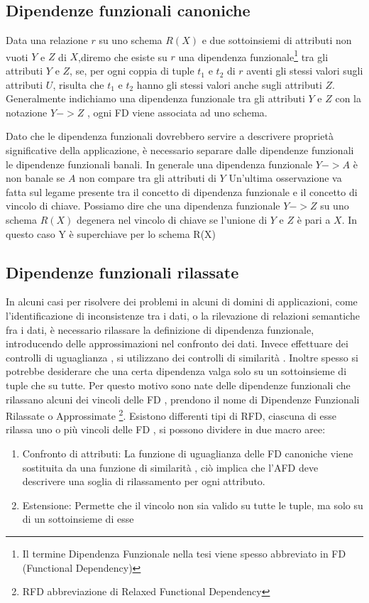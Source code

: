 \subsection{Dipendenze funzionali canoniche}
Data una relazione $r$ su uno schema $R(X)$ e due sottoinsiemi di attributi non vuoti $Y$ e $Z$ di $X$,diremo che esiste su $r$ una dipendenza funzionale\footnote{Il termine Dipendenza Funzionale nella tesi viene spesso abbreviato in FD (Functional Dependency)} tra gli attributi $Y$ e $Z$, se, per ogni coppia di tuple $t_1$ e $t_2$ di $r$ aventi gli stessi valori sugli attributi $U$, risulta che $t_1$ e $t_2$ hanno gli stessi valori anche sugli attributi $Z$.
Generalmente indichiamo una dipendenza funzionale tra gli attributi $Y$ e $Z$ con la notazione $Y->Z$ , ogni FD  viene associata ad uno schema.

Dato che le dipendenza funzionali dovrebbero servire a descrivere proprietà significative della applicazione, è necessario separare dalle dipendenze funzionali le dipendenze funzionali banali.
In generale una dipendenza funzionale $Y->A$ è non banale se $A$ non compare tra gli attributi di $Y$
Un'ultima osservazione va fatta sul legame presente tra il concetto di dipendenza funzionale e il concetto di vincolo di chiave. Possiamo dire che una dipendenza funzionale $Y->Z$ su uno schema $R(X)$ degenera nel vincolo di chiave se l’unione di $Y$ e $Z$ è pari a $X$. In questo caso Y è superchiave per lo schema R(X)
\subsection{Dipendenze funzionali rilassate}
In alcuni casi per risolvere dei problemi in alcuni di domini di applicazioni, come l’identificazione di inconsistenze tra i dati, o la rilevazione di relazioni semantiche fra i dati,  è necessario rilassare la definizione di dipendenza funzionale, introducendo delle approssimazioni nel confronto dei dati. Invece effettuare dei controlli di uguaglianza , si utilizzano dei controlli di similarità .
Inoltre spesso si potrebbe desiderare che una certa dipendenza valga solo su un sottoinsieme di tuple che su tutte.
Per questo motivo sono nate delle dipendenze funzionali che rilassano alcuni dei vincoli delle FD , prendono il nome di Dipendenze Funzionali Rilassate o Approssimate \footnote{RFD abbreviazione di Relaxed Functional Dependency}.
Esistono differenti tipi di RFD, ciascuna di esse rilassa uno o più vincoli delle FD , si possono dividere in due macro aree:
\begin{enumerate}
    \item Confronto di attributi: La funzione di uguaglianza delle FD canoniche viene sostituita da una funzione di similarità , ciò implica che l'AFD deve descrivere una soglia di rilassamento per ogni attributo.
    \item Estensione: Permette che il vincolo non sia valido su tutte le tuple, ma solo su di un sottoinsieme di esse
\end{enumerate}


